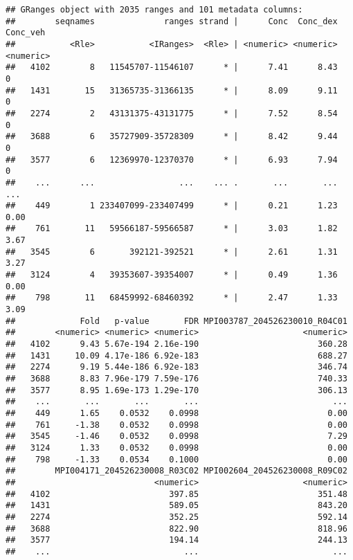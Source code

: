 \documentclass[
]{article}
\begin{document}
\begin{verbatim}
## GRanges object with 2035 ranges and 101 metadata columns:
##        seqnames              ranges strand |      Conc  Conc_dex  Conc_veh
##           <Rle>           <IRanges>  <Rle> | <numeric> <numeric> <numeric>
##   4102        8   11545707-11546107      * |      7.41      8.43         0
##   1431       15   31365735-31366135      * |      8.09      9.11         0
##   2274        2   43131375-43131775      * |      7.52      8.54         0
##   3688        6   35727909-35728309      * |      8.42      9.44         0
##   3577        6   12369970-12370370      * |      6.93      7.94         0
##    ...      ...                 ...    ... .       ...       ...       ...
##    449        1 233407099-233407499      * |      0.21      1.23      0.00
##    761       11   59566187-59566587      * |      3.03      1.82      3.67
##   3545        6       392121-392521      * |      2.61      1.31      3.27
##   3124        4   39353607-39354007      * |      0.49      1.36      0.00
##    798       11   68459992-68460392      * |      2.47      1.33      3.09
##             Fold   p-value       FDR MPI003787_204526230010_R04C01
##        <numeric> <numeric> <numeric>                     <numeric>
##   4102      9.43 5.67e-194 2.16e-190                        360.28
##   1431     10.09 4.17e-186 6.92e-183                        688.27
##   2274      9.19 5.44e-186 6.92e-183                        346.74
##   3688      8.83 7.96e-179 7.59e-176                        740.33
##   3577      8.95 1.69e-173 1.29e-170                        306.13
##    ...       ...       ...       ...                           ...
##    449      1.65    0.0532    0.0998                          0.00
##    761     -1.38    0.0532    0.0998                          0.00
##   3545     -1.46    0.0532    0.0998                          7.29
##   3124      1.33    0.0532    0.0998                          0.00
##    798     -1.33    0.0534    0.1000                          0.00
##        MPI004171_204526230008_R03C02 MPI002604_204526230008_R09C02
##                            <numeric>                     <numeric>
##   4102                        397.85                        351.48
##   1431                        589.05                        843.20
##   2274                        352.25                        592.14
##   3688                        822.90                        818.96
##   3577                        194.14                        244.13
##    ...                           ...                           ...

\end{verbatim}
\end{document}
